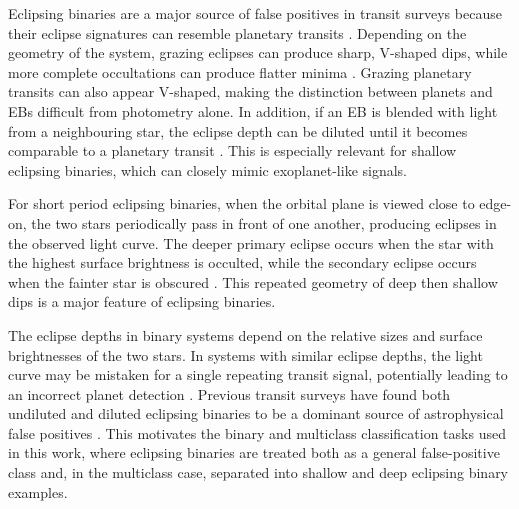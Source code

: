 Eclipsing binaries are a major source of false positives in transit surveys because their eclipse signatures can resemble planetary transits \citep{Morton_2016}. Depending on the geometry of the system, grazing eclipses can produce sharp, V-shaped dips, while more complete occultations can produce flatter minima \citep{2010exop.book...55W}. Grazing planetary transits can also appear V-shaped, making the distinction between planets and EBs difficult from photometry alone. In addition, if an EB is blended with light from a neighbouring star, the eclipse depth can be diluted until it becomes comparable to a planetary transit \citep{Morton_2016}. This is especially relevant for shallow eclipsing binaries, which can closely mimic exoplanet-like signals.

For short period eclipsing binaries, when the orbital plane is viewed close to edge-on, the two stars periodically pass in front of one another, producing eclipses in the observed light curve. The deeper primary eclipse occurs when the star with the highest surface brightness is occulted, while the secondary eclipse occurs when the fainter star is obscured \citep{2012ApJ...748...96M}. This repeated geometry of deep then shallow dips is a major feature of eclipsing binaries.

The eclipse depths in binary systems depend on the relative sizes and surface brightnesses of the two stars. In systems with similar eclipse depths, the light curve may be mistaken for a single repeating transit signal, potentially leading to an incorrect planet detection \citep{fp_first_habitable_zone}. Previous transit surveys have found both undiluted and diluted eclipsing binaries to be a dominant source of astrophysical false positives \citep{2008A&A...488L..47M, 2009IAUS..253..382A, 2013A&A...553A..30T}. This motivates the binary and multiclass classification tasks used in this work, where eclipsing binaries are treated both as a general false-positive class and, in the multiclass case, separated into shallow and deep eclipsing binary examples.